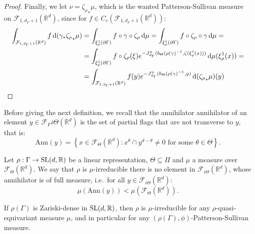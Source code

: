 \documentclass{report}
\begin{document}
\begin{proof}
    Finally, we let $\nu = {\zeta_\rho}_* \mu$, which is the wanted Patterson-Sullivan measure on $\mathcal F_{1, d_\Gamma + 1} (\mathbb R^d)$, since for $f \in C_c(\mathcal F_{1, d_\Gamma + 1} (\mathbb R^d))$:
    \begin{align*}
        \int_{\mathcal F_{1, d_\Gamma + 1} (\mathbb R^d)} f \,\mathrm{d}(\gamma_* {\zeta_\rho}_* \mu) &=
        \int_{\xi_\rho^1(\partial \Gamma)} f \circ \gamma \circ \zeta_\rho \,\mathrm{d} \mu =
        \int_{\xi_\rho^1(\partial \Gamma)} f \circ \zeta_\rho \circ \gamma \,\mathrm{d} \mu =\\
        &=
        \int_{\xi_\rho^1(\partial \Gamma)} f \circ \zeta_\rho(\xi) e^{-J_{d_\Gamma}^u(b_\Theta(\rho(\gamma)^{-1}, \zeta(\xi_\rho^1(x)))} \,\mathrm{d} \mu(\xi_\rho^1(x)) =\\
        &=
        \int_{\mathcal F_{1, d_\Gamma + 1} (\mathbb R^d)} 
        f(y) e^{-J_{d_\Gamma}^u(b_\Theta(\rho(\gamma)^{-1}, y)} \,\mathrm{d} ({\zeta_\rho}_*\mu)(y)
    \end{align*}
\end{proof}

Before giving the next definition, we recall that the annihilator annihilator of an element $y \in \mathcal F_F{i \Theta}(\mathbb R^d)$ is the set of partial flags that are not transverse to $y$, that is:
\[
    \mathrm{Ann}(y) = \left\{ x \in \mathcal F_{\Theta}(\mathbb R^d) : x^\theta \cap y^{d- \theta} \neq 0 \text{ for some } \theta \in \Theta \right\}.
\]
\begin{definition}
Let $\rho: \Gamma \to \operatorname{{\mathrm{SL}}}(d,\mathbb R)$ be a linear representation, $\Theta \subseteq \Pi$ and $\mu$ a measure over $\mathcal F_\Theta(\mathbb R^d)$.
We say that $\rho$ is $\mu$-irreducible there is no element in $\mathcal F_{i \Theta}(\mathbb R^d)$, whose annihilator is of full measure, i.e.\ for all $y \in \mathcal F_{i \Theta}(\mathbb R^d)$:
\[
    \mu(\mathrm{Ann}(y)) < \mu(\mathcal F_{\Theta}(\mathbb R^d)).
\]
\end{definition}

\begin{example}
    If $\rho(\Gamma)$ is Zariski-dense in $\operatorname{{\mathrm{SL}}} (d, \mathbb R)$, then $\rho$ is $\mu$-irreducible for any $\rho$-quasi-equivariant measure $\mu$, and in particular for any $(\rho(\Gamma), \phi)$-Patterson-Sullivan measure.
\end{example}
\end{document}

